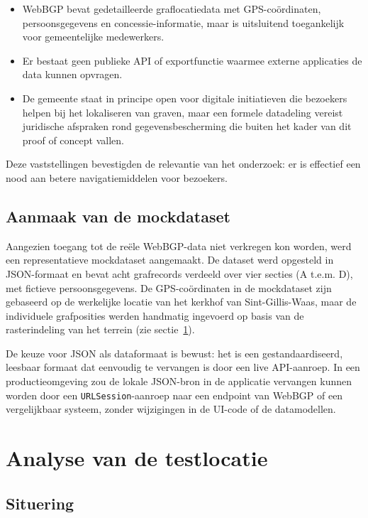 \begin{itemize}
    \item WebBGP bevat gedetailleerde graflocatiedata met GPS-coördinaten, persoonsgegevens en concessie-informatie, maar is uitsluitend toegankelijk voor gemeentelijke medewerkers.
    \item Er bestaat geen publieke API of exportfunctie waarmee externe applicaties de data kunnen opvragen.
    \item De gemeente staat in principe open voor digitale initiatieven die bezoekers helpen bij het lokaliseren van graven, maar een formele datadeling vereist juridische afspraken rond gegevensbescherming die buiten het kader van dit proof of concept vallen.
\end{itemize}

Deze vaststellingen bevestigden de relevantie van het onderzoek: er is effectief een nood aan betere navigatiemiddelen voor bezoekers.
\subsection{Aanmaak van de mockdataset}

Aangezien toegang tot de reële WebBGP-data niet verkregen kon worden, werd een representatieve mockdataset aangemaakt. De dataset werd opgesteld in JSON-formaat en bevat acht grafrecords verdeeld over vier secties (A t.e.m. D), met fictieve persoonsgegevens. De GPS-coördinaten in de mockdataset zijn gebaseerd op de werkelijke locatie van het kerkhof van Sint-Gillis-Waas, maar de individuele grafposities werden handmatig ingevoerd op basis van de rasterindeling van het terrein (zie sectie~\ref{sec:testlocatie}).

De keuze voor JSON als dataformaat is bewust: het is een gestandaardiseerd, leesbaar formaat dat eenvoudig te vervangen is door een live API-aanroep. In een productieomgeving zou de lokale JSON-bron in de applicatie vervangen kunnen worden door een \texttt{URLSession}-aanroep naar een endpoint van WebBGP of een vergelijkbaar systeem, zonder wijzigingen in de UI-code of de datamodellen.

\section{Analyse van de testlocatie}
\label{sec:testlocatie}

\subsection{Situering}

